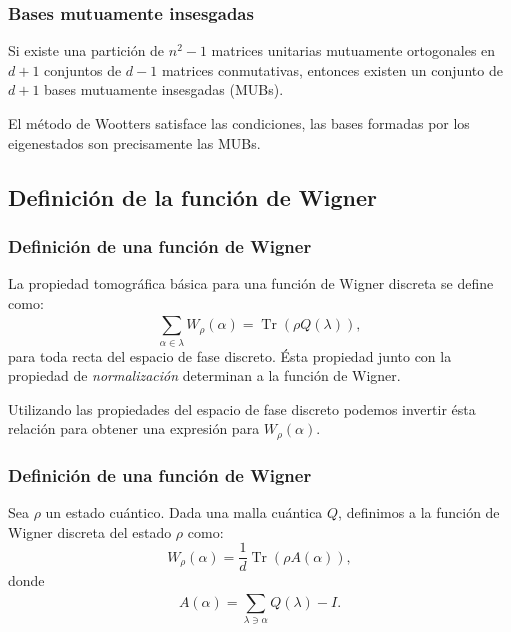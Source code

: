 \documentclass[10pt]{beamer}
\DeclareMathOperator{\Tr}{Tr}
\begin{document}
  \begin{frame}
    \frametitle{Bases mutuamente insesgadas}

    \begin{theorem}[Bandyophyay et al]
      Si existe una partición de $n^2-1$ matrices unitarias
      mutuamente ortogonales en $d+1$ conjuntos de $d-1$ 
      matrices conmutativas, entonces existen un conjunto de
      $d+1$ bases mutuamente insesgadas (MUBs).
    \end{theorem} 

    \vspace{15pt}

    El método de Wootters satisface las condiciones, las
    bases formadas por los eigenestados son precisamente las
    MUBs.
  \end{frame}

  \subsection{Definición de la función de Wigner}

  \begin{frame}
    \frametitle{Definición de una función de Wigner}

    La propiedad tomográfica básica para una función de
    Wigner discreta se define como:
    \begin{equation}
      \sum_{\alpha \in \lambda}^{} W_\rho(\alpha)
      = \Tr\left( \rho Q(\lambda) \right),
    \end{equation}
    para toda recta del espacio de fase discreto. Ésta
    propiedad junto con la propiedad de
    \textit{normalización} determinan a la función de
    Wigner.

    \vspace{10pt}

    Utilizando las propiedades del espacio de fase
    discreto podemos invertir ésta relación para obtener una
    expresión para $W_\rho(\alpha)$.
  \end{frame}

  \begin{frame}
    \frametitle{Definición de una función de Wigner}

    \begin{definition}
      Sea $\rho$ un estado cuántico. Dada una malla cuántica
      $Q$, definimos a la función de Wigner discreta del
      estado $\rho$ como:
      \begin{equation}
        W_\rho(\alpha)
        = \frac{1}{d} \Tr\left( \rho A(\alpha) \right),
      \end{equation}
      donde
      \begin{equation}
        A(\alpha)
        = \sum_{\lambda \ni \alpha}^{} Q(\lambda) - I.
      \end{equation}
    \end{definition}
  \end{frame}
\end{document}
